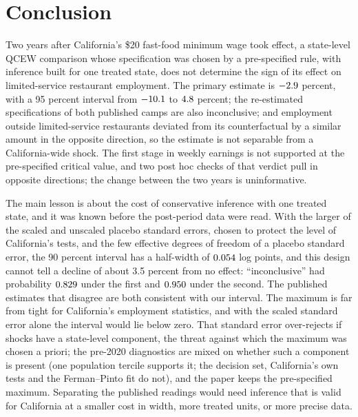 \section{Conclusion}
\label{sec:conclusion}

Two years after California's \$20 fast-food minimum wage took effect, a state-level QCEW comparison
whose specification was chosen by a pre-specified rule, with inference built for one treated
state, does not determine the sign of its effect on limited-service restaurant employment. The
primary estimate is $-2.9$ percent, with a 95 percent interval from $-10.1$ to
$4.8$ percent; the re-estimated specifications of both published camps are also
inconclusive; and employment outside limited-service restaurants deviated from its counterfactual
by a similar amount in the opposite direction, so the estimate is not separable from a
California-wide shock. The first stage in weekly earnings is not supported at the pre-specified
critical value, and two post hoc checks of that verdict pull in opposite directions; the change
between the two years is uninformative.

The main lesson is about the cost of conservative inference with one treated state, and it was
known before the post-period data were read. With the larger of the scaled and unscaled placebo
standard errors, chosen to protect the level of California's tests, and the few effective degrees
of freedom of a placebo standard error, the 90 percent interval has a half-width of
$0.054$ log points, and this design cannot tell a decline of about 3.5 percent from no
effect: ``inconclusive'' had probability $0.829$ under the first and
$0.950$ under the second. The published estimates that disagree are both consistent
with our interval. The maximum is far from tight for California's employment statistics, and with
the scaled standard error alone the interval would lie below zero. That standard error over-rejects
if shocks have a state-level component, the threat against which the maximum was chosen a priori;
the pre-2020 diagnostics are mixed on whether such a component is present (one population tercile
supports it; the decision set, California's own tests and the Ferman--Pinto fit do not), and the
paper keeps the pre-specified maximum. Separating the published readings would need inference that is valid for California
at a smaller cost in width, more treated units, or more precise data.

